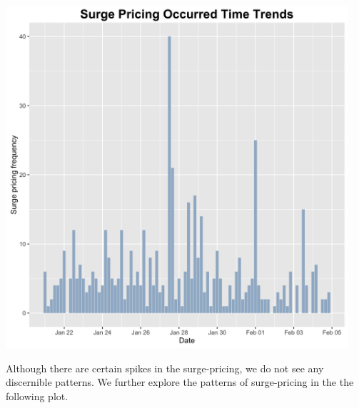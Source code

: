 \documentclass[a222,landscape]{a0poster}
\begin{document}
\begin{multicols}{4}
\begin{center}
\includegraphics[width=\linewidth, height=5in]{../figures/Poster_TimeSeries.png}

\end{center}\vspace{0.25 cm}

Although there are certain spikes in the surge-pricing, we do not see any discernible patterns. We further explore the patterns of surge-pricing in the the following plot.

\begin{center}\vspace{0.75 cm}


\end{center}
\end{multicols}
\end{document}

